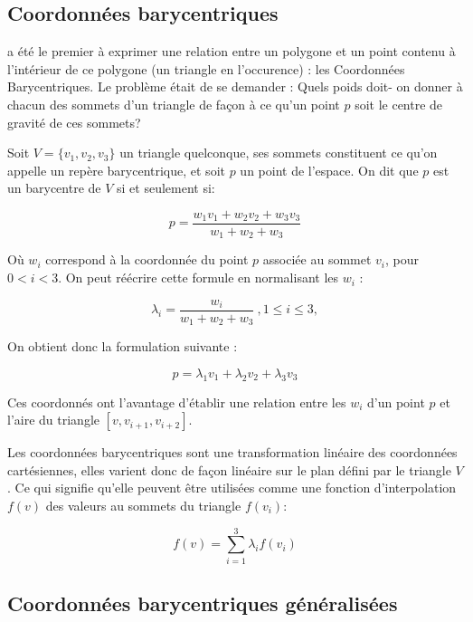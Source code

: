 \subsection{Coordonnées barycentriques}

\cite{Mob27} a été le premier à exprimer une relation entre un polygone et un
point contenu à l'intérieur de ce polygone (un triangle en l'occurence) : les
Coordonnées Barycentriques. Le problème était de se demander : Quels poids
doit- on donner à chacun des sommets d'un triangle de façon à ce qu'un point
$p$ soit le centre de gravité de ces sommets?

Soit $V = \{v_1, v_2, v_3\}$ un triangle quelconque, ses sommets constituent ce
qu'on appelle un repère barycentrique, et soit $p$ un point de l'espace. On dit
que $p$ est un barycentre de $V$ si et seulement si:

\begin{equation}
  p = \frac{w_1 v_1 + w_2 v_2 + w_3 v_3}{w_1+w_2+w_3}
\end{equation}

Où $w_i$ correspond à la coordonnée du point $p$ associée au sommet $v_i$,
pour $0 < i < 3$. On peut réécrire cette formule en normalisant les $w_i$ :

\begin{equation}
  \lambda_i = \frac{w_i}{w_1+w_2+w_3} ~, 1 \leq i \leq 3, 
\end{equation}

On obtient donc la formulation suivante :

\begin{equation}
  p = \lambda_1 v_1 + \lambda_2 v_2 + \lambda_3 v_3
\end{equation}

Ces coordonnés ont l'avantage d'établir une relation entre les $w_i$ d'un
point $p$ et l'aire du triangle $[v, v_{i+1}, v_{i+2}]$.

Les coordonnées barycentriques sont une transformation linéaire des
coordonnées cartésiennes, elles varient donc de façon linéaire sur le plan
défini par le triangle $V$. Ce qui signifie qu'elle peuvent être utilisées
comme une fonction d'interpolation $f(v)$ des valeurs au sommets du triangle
$f(v_i)$:

\begin{equation}
  f(v) = \sum_{i=1}^{3} \lambda_i f(v_i)
\end{equation}

\subsection{Coordonnées barycentriques généralisées}

